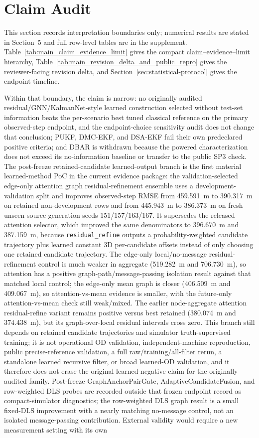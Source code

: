 \documentclass{article}
\begin{document}
\section{Claim Audit}\label{sec:claim-audit}
This section records interpretation boundaries only; numerical results are stated in Section~5 and full row-level tables are in the supplement. Table~\ref{tab:main_claim_evidence_limit} gives the compact claim--evidence--limit hierarchy, Table~\ref{tab:main_revision_delta_and_public_repro} gives the reviewer-facing revision delta, and Section~\ref{sec:statistical-protocol} gives the endpoint timeline.

Within that boundary, the claim is narrow: no originally audited residual/GNN/KalmanNet-style learned construction selected without test-set information beats the per-scenario best tuned classical reference on the primary observed-step endpoint, and the endpoint-choice sensitivity audit does not change that conclusion; PUKF, DMC-EKF, and DSA-EKF fail their own predeclared positive criteria; and DBAR is withdrawn because the powered characterization does not exceed its no-information baseline or transfer to the public SP3 check. The post-freeze retained-candidate learned-output branch is the first material learned-method PoC in the current evidence package: the validation-selected edge-only attention graph residual-refinement ensemble uses a development-validation split and improves observed-step RMSE from 459.591~m to 390.317~m on retained non-development rows and from 445.943~m to 386.373~m on fresh unseen source-generation seeds 151/157/163/167. It supersedes the released attention selector, which improved the same denominators to 396.670~m and 387.159~m, because \texttt{residual\_refine} outputs a probability-weighted candidate trajectory plus learned constant 3D per-candidate offsets instead of only choosing one retained candidate trajectory. The edge-only local/no-message residual-refinement control is much weaker in aggregate (519.282~m and 706.730~m), so attention has a positive graph-path/message-passing isolation result against that matched local control; the edge-only mean graph is closer (406.509~m and 409.067~m), so attention-vs-mean evidence is smaller, with the future-only attention-vs-mean check still weak/mixed. The earlier node-aggregate attention residual-refine variant remains positive versus best retained (380.074~m and 374.438~m), but its graph-over-local residual intervals cross zero. This branch still depends on retained candidate trajectories and simulator truth-supervised training; it is not operational OD validation, independent-machine reproduction, public precise-reference validation, a full raw/training/all-filter rerun, a standalone learned recursive filter, or broad learned-OD validation, and it therefore does not erase the original learned-negative claim for the originally audited family. Post-freeze GraphAnchorPairGate, AdaptiveCandidateFusion, and row-weighted DLS probes are recorded outside that frozen endpoint record as compact-simulator diagnostics; the row-weighted DLS graph result is a small fixed-DLS improvement with a nearly matching no-message control, not an isolated message-passing contribution. External validity would require a new measurement setting with its own 
\end{document}
